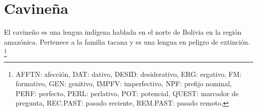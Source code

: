 \section*{Cavineña}

\noindent El cavineño es una lengua indígena hablada en el norte de Bolivia en la región amazónica. Pertenece a la familia tacana y es una lengua en peligro de extinción.
\footnote{AFFTN: afección, DAT: dativo, DESID: desiderativo, ERG: ergativo, FM: formativo, GEN: genitivo, IMPFV: imperfectivo, NPF: prefijo nominal, PERF: perfecto, PERL: perlativo, POT: potencial, QUEST: marcador de pregunta, REC.PAST: pasado reciente, REM.PAST: pasado remoto,}
\vspace{0.5cm}

